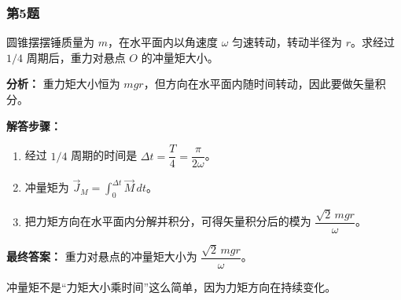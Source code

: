 \documentclass[12pt,a4paper]{ctexart}
\begin{document}
\subsubsection*{第5题}
\begin{tcolorbox}[colback=gray!2!white,colframe=black!60,title={题目}]
圆锥摆摆锤质量为 \(m\)，在水平面内以角速度 \(\omega\) 匀速转动，转动半径为 \(r\)。求经过 \(1/4\) 周期后，重力对悬点 \(O\) 的冲量矩大小。\par
\end{tcolorbox}
\begin{tcolorbox}[colback=blue!2!white,colframe=blue!55!black,title={完整答案}]
\textbf{分析：}
重力矩大小恒为 \(mgr\)，但方向在水平面内随时间转动，因此要做矢量积分。\par
\textbf{解答步骤：}
\begin{enumerate}
\item 经过 \(1/4\) 周期的时间是 \(\Delta t=\dfrac{T}{4}=\dfrac{\pi}{2\omega}\)。
\item 冲量矩为 \(\vec J_M=\int_0^{\Delta t}\vec M\,dt\)。
\item 把力矩方向在水平面内分解并积分，可得矢量积分后的模为 \(\dfrac{\sqrt2\,mgr}{\omega}\)。
\end{enumerate}
\textbf{最终答案：}
重力对悬点的冲量矩大小为 \(\dfrac{\sqrt2\,mgr}{\omega}\)。\par
\end{tcolorbox}
\begin{tcolorbox}[colback=red!2!white,colframe=red!55!black,title={易错点}]
冲量矩不是“力矩大小乘时间”这么简单，因为力矩方向在持续变化。\par
\end{tcolorbox}
\end{document}
